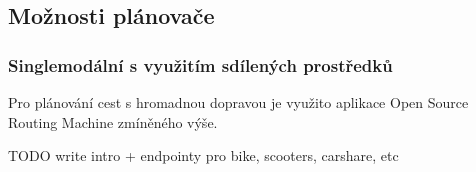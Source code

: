 \documentclass[thesis=M,czech]{FITthesis}[2019/12/23]
\theoremstyle{plain}
\theoremstyle{definition}
\begin{document}







\subsection{Možnosti plánovače}

\subsubsection{Singlemodální s využitím sdílených prostředků}

Pro plánování cest s hromadnou dopravou je využito aplikace Open Source Routing Machine zmíněného výše.

TODO write intro + endpointy pro bike, scooters, carshare, etc
\end{document}

